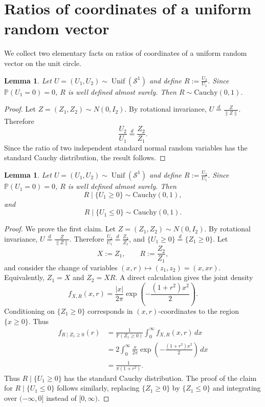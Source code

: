 \documentclass[11pt]{article}
\theoremstyle{plain}
\newtheorem{lemma}[theorem]{Lemma}
\theoremstyle{definition}
\newcommand{\equald}{\stackrel{d}{=}}
\renewcommand{\P}{\mathbb{P}}
\newcommand{\mcS}{\mathcal{S}}
\begin{document}
\section{Ratios of coordinates of a uniform random vector}\label{sec:coordratios}
We collect two elementary facts on ratios of coordinates of a uniform random vector on the unit circle.
\begin{lemma}\label{lem:ratioUnifSphere}
    Let $U =(U_1,U_2) \sim \operatorname{Unif}(\mcS^{1})$ and define $R := \frac{U_2}{U_1}$. Since $\P(U_1=0)=0$, $R$ is well defined almost surely. Then $R \sim \mathrm{Cauchy}(0,1)$.
\end{lemma}
 \begin{proof}
    Let $Z = (Z_1,Z_2) \sim N(0,I_2)$. By rotational invariance, $U\equald \frac{Z}{\|Z\|}$. Therefore
    \[
        \frac{U_2}{U_1}
        \equald
        \frac{Z_2}{Z_1}.
    \]
    Since the ratio of two independent standard normal random variables has the standard Cauchy distribution, the result follows.
\end{proof}



\begin{lemma}\label{lem:ratioUnifSphereConditionalOnSignU1}
    Let $U =(U_1,U_2) \sim \operatorname{Unif}(\mcS^{1})$ and define
    $R := \frac{U_2}{U_1}$. Since $\P(U_1=0)=0$, $R$ is well defined
    almost surely. Then
    \[
        R \mid \{U_1\ge 0\} \sim \mathrm{Cauchy}(0,1),
    \]
    and 
    \[
        R \mid \{U_1\le 0\} \sim \mathrm{Cauchy}(0,1).
    \]
\end{lemma}


\begin{proof}
    We prove the first claim. Let $Z = (Z_1,Z_2) \sim N(0,I_2)$. By rotational invariance,
    $U\equald \frac{Z}{\|Z\|}$. Therefore $\frac{U_2}{U_1} \equald \frac{Z_2}{Z_1}$, and $\{U_1\ge0\} \equald \{Z_1\ge0\}$.
    Let
    \[
        X:=Z_1,
        \qquad
        R:=\frac{Z_2}{Z_1},
    \]
    and consider the change of variables $(x,r)\mapsto (z_1,z_2)=(x,xr)$. Equivalently, $Z_1=X$ and $Z_2=XR$. A direct calculation gives the joint density
    \[
        f_{X,R}(x,r)
        =
        \frac{|x|}{2\pi}
        \exp\left(-\frac{(1+r^2)x^2}{2}\right).
    \]
    Conditioning on $\{Z_1\ge0\}$ corresponds in $(x,r)$-coordinates to the region $\{x\ge0\}$. Thus
    \begin{align*}
        f_{R\mid Z_1\ge0}(r)
        &=
        \frac{1}{\P(Z_1\ge0)}
        \int_0^\infty f_{X,R}(x,r)\,dx \\
        &=
        2
        \int_0^\infty
        \frac{x}{2\pi}
        \exp\left(-\frac{(1+r^2)x^2}{2}\right)\,dx \\
        &=
        \frac{1}{\pi(1+r^2)}.
    \end{align*}
    Thus $R \mid \{U_1\ge0\}$ has the standard Cauchy distribution. The proof of the claim for $R \mid \{U_1\le0\}$ follows similarly, replacing $\{Z_1\ge0\}$ by $\{Z_1\le0\}$ and integrating over $(-\infty,0]$ instead of $[0,\infty)$.
\end{proof}
\end{document}
